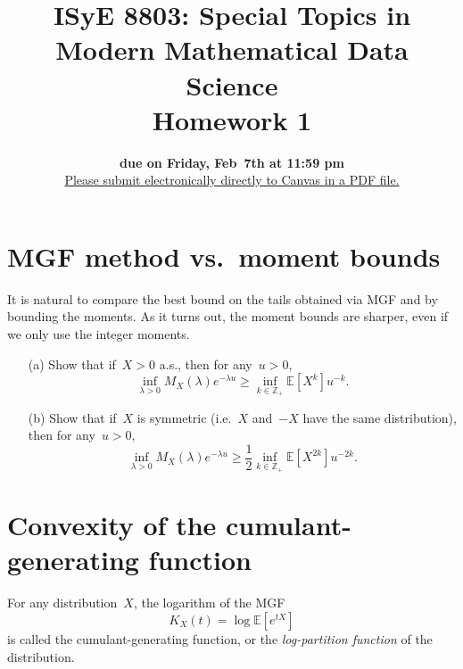 \documentclass[11pt]{article}
\title{ISyE 8803: Special Topics in Modern Mathematical Data Science\\ 
	   Homework 1}
\date{
\vspace{-0.3cm}
{\bf due on Friday, Feb~7th at 11:59 pm}\\
\vspace{0.3cm}
\underline{Please submit electronically directly to Canvas in a PDF file.}
}
\author{}
\newcommand{\proofstep}[1]{$\boldsymbol{{#1}^o}$}
\newcommand{\R}{\mathds{R}}
\newcommand{\Z}{\mathds{Z}}
\newcommand{\E}{\mathds{E}}
\newcommand{\Cov}{\textup{Cov}}
\newcommand{\bSigma}{\boldsymbol{\Sigma}}
\newcommand{\bId}{\boldsymbol{I}}
\newcommand{\geqs}{\geqslant}
\renewcommand{\ge}{\geqs}
\begin{document}
\maketitle
\newcommand{\vsp}{\vspace{0.3cm}}

%


\newpage
\noindent 
\section{MGF method vs.~moment bounds}

It is natural to compare the best bound on the tails obtained via MGF and by bounding the moments.
As it turns out, the moment bounds are sharper, even if we only use the integer moments.

\begin{itemize}
\item[(a)]
Show that if~$X > 0$ a.s., then for any~$u > 0$,
\[
\inf_{\lambda > 0} {M_X(\lambda)}e^{-\lambda u} \ge 
\inf_{k \in \Z_+} {\E\left[X^k\right]}u^{-k}.
\]
\item[(b)]
Show that if~$X$ is symmetric (i.e.~$X$ and~$-X$ have the same distribution), then for any~$u > 0$,
\[
\inf_{\lambda > 0} {M_X(\lambda)}e^{-\lambda u} \ge 
\frac{1}{2}\inf_{k \in \Z_+} {\E\left[X^{2k}\right]}u^{-2k}.
\]
\end{itemize}


\newpage
\noindent
\section{Convexity of the cumulant-generating function}
For any distribution~$X$, the logarithm of the MGF
\[
K_X(t) = \log\E[e^{tX}]  
\]
is called the cumulant-generating function, or the {\em log-partition function} of the distribution.
\end{document}
